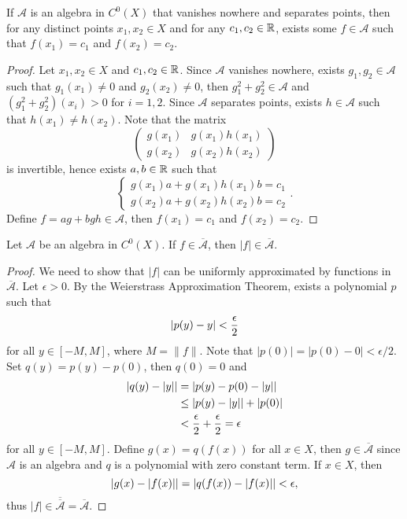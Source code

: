 \begin{lm}
    \label{lm:two-point-approx}
    If $\mathcal A$ is an algebra in $C^0(X)$ that vanishes nowhere and separates points, then for any distinct points $x_1, x_2 \in X$ and for any $c_1, c_2 \in {\mathbb R}$, exists some $f \in \mathcal A$ such that $f(x_1) = c_1$ and $f(x_2) = c_2$.
    \begin{proof}
        Let $x_1, x_2 \in X$ and $c_1, c_2 \in {\mathbb R}$. Since $\mathcal A$ vanishes nowhere, exists $g_1, g_2 \in \mathcal A$ such that $g_1(x_1) \neq 0$ and $g_2(x_2) \neq 0$, then $g_1^2 + g_2^2 \in \mathcal A$ and $(g_1^2 + g_2^2)(x_i) > 0$ for $i = 1, 2$. Since $\mathcal A$ separates points, exists $h \in \mathcal A$ such that $h(x_1) \neq h(x_2)$. Note that the matrix
        \[
        \begin{pmatrix}
            g(x_1) & g(x_1)h(x_1) \\
            g(x_2) & g(x_2)h(x_2)
        \end{pmatrix}
        \]
        is invertible, hence exists $a, b \in {\mathbb R}$ such that
        \[
        \begin{cases}
            g(x_1)a + g(x_1)h(x_1)b = c_1 \\
            g(x_2)a + g(x_2)h(x_2)b = c_2
        \end{cases}.
        \]
        Define $f = ag + bgh \in \mathcal A$, then $f(x_1) = c_1$ and $f(x_2) = c_2$.
    \end{proof}
\end{lm}

\begin{lm}
    Let $\mathcal A$ be an algebra in $C^0(X)$. If $f \in \overline{\mathcal A}$, then $|f| \in \overline{\mathcal A}$.
    \begin{proof}
        We need to show that $|f|$ can be uniformly approximated by functions in $\overline{\mathcal A}$. Let $\epsilon > 0$. By the Weierstrass Approximation Theorem, exists a polynomial $p$ such that
        \[
        {\left| p(y) - y \right|} < \frac{\epsilon}{2}
        \]
        for all $y \in [-M, M]$, where $M = \|f\|$. Note that $|p(0)| = |p(0) - 0| < \epsilon/2$. Set $q(y) = p(y) - p(0)$, then $q(0) = 0$ and
        \begin{align*}
            |q(y) - |y|| &= {\left| p(y) - p(0) - |y| \right|} \\
            &\leq |p(y) - |y|| + |p(0)| \\
            &< \frac{\epsilon}{2} + \frac{\epsilon}{2} = \epsilon
        \end{align*}
        for all $y \in [-M, M]$. Define $g(x) = q(f(x))$ for all $x \in X$, then $g \in \overline{\mathcal A}$ since $\mathcal A$ is an algebra and $q$ is a polynomial with zero constant term. If $x \in X$, then
        \[
        {\left| g(x) - |f(x)| \right|} = {\left| q(f(x)) - |f(x)| \right|} < \epsilon,
        \]
        thus $|f| \in \overline{\overline{\mathcal A}} = \overline{\mathcal A}$.
    \end{proof}
\end{lm}


